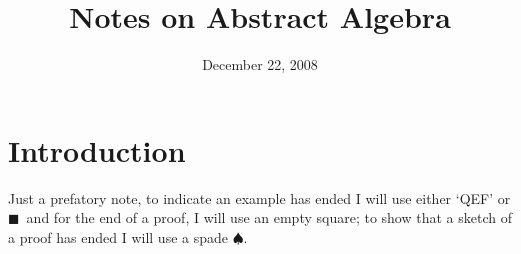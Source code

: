 \documentclass[10pt]{article}
\title{Notes on Abstract Algebra}
\date{December 22, 2008}
\theoremstyle{definition}
\def\qef{$\blacksquare$}
\begin{document}
\maketitle
\tableofcontents
\listoffigures
\section*{Introduction}
\begin{rmk}
Just a prefatory note, to indicate an example has ended I
will use either `QEF' or \qef ~and for the end of a proof, I
will use an empty square; to show that a sketch of a proof
has ended I will use a spade $\spadesuit$.
\end{rmk}

\nocite{*}


\end{document}
